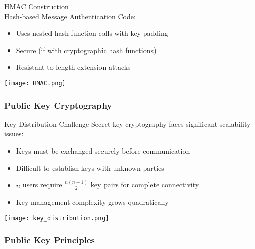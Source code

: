 \begin{concept}{HMAC Construction}\\
    Hash-based Message Authentication Code:

    \begin{itemize}
        \item Uses nested hash function calls with key padding
        \item Secure (if with cryptographic hash functions)
        \item Resistant to length extension attacks
    \end{itemize}
    \texttt{[image: HMAC.png]}
\end{concept}

\multend




\subsubsection{Public Key Cryptography}

\begin{minipage}{0.6\linewidth}
\begin{concept}{Key Distribution Challenge}
    Secret key cryptography faces significant scalability issues:
    \begin{itemize}
        \item Keys must be exchanged securely before communication
        \item Difficult to establish keys with unknown parties
        \item $n$ users require $\frac{n(n-1)}{2}$ key pairs for complete connectivity
        \item Key management complexity grows quadratically
    \end{itemize}
    
\end{concept}
\end{minipage}
\begin{minipage}{0.4\linewidth}
    \texttt{[image: key\_distribution.png]}
\end{minipage}

\subsubsection{Public Key Principles}

